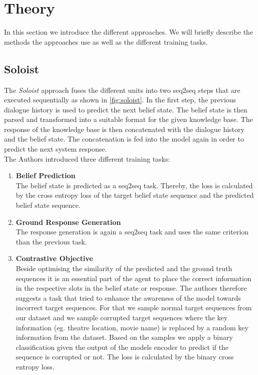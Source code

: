\documentclass[twocolumn]{tum-article}
\begin{document}
\section{Theory}
In this section we introduce the different approaches. We will briefly describe the methods the approaches use as well as the different training tasks. 
\subsection{Soloist}The \textit{Soloist}\cite{peng2020soloist} approach fuses the different units into two seq2seq steps that are executed sequentially as shown in \autoref{fig:soloist}. In the first step, the previous dialogue history is used to predict the next belief state. The belief state is then parsed and transformed into a suitable format for the given knowledge base. The response of the knowledge base is then concatenated with the dialogue history and the belief state. The concatenation is fed into the model again in order to predict the next system response.\\
The Authors introduced three different training tasks:
\begin{enumerate}
\item \textbf{Belief Prediction}\\
The belief state is predicted as a seq2seq task. Thereby, the loss is calculated by the cross entropy loss of the target belief state sequence and the predicted belief state sequence.  
\item \textbf{Ground Response Generation}\\
The response generation is again a seq2seq task and uses the same criterion than the previous task.
\item \textbf{Contrastive Objective}\\
Beside optimising the similarity of the predicted and the ground truth sequences it is an essential part of the agent to place the correct information in the respective slots in the belief state or response. The authors therefore suggests a task that tried to enhance the awareness of the model towards incorrect target sequences. For that we sample normal target sequences from our dataset and we sample corrupted target sequences where the key information (eg. theatre location, movie name) is replaced by a random key information from the dataset. Based on the samples we apply a binary classification given the output of the models encoder to predict if the sequence is corrupted or not. The loss is calculated by the binary cross entropy loss. 
\end{enumerate}
\end{document}
